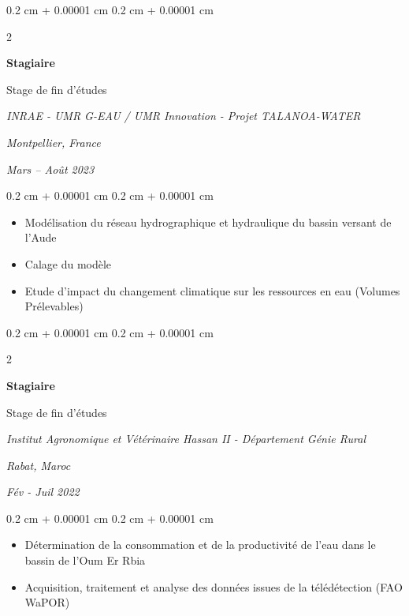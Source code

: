 \documentclass[10pt, letterpaper]{article}
\newenvironment{highlights}{
  \begin{itemize}[
    topsep=0.10 cm,
    parsep=0.10 cm,
    partopsep=0pt,
    itemsep=0pt,
    leftmargin=0.4 cm + 10pt
  ]
}{
  \end{itemize}
} %
\newenvironment{onecolentry}{
  \begin{adjustwidth}{
    0.2 cm + 0.00001 cm
  }{
    0.2 cm + 0.00001 cm
  }
}{
  \end{adjustwidth}
} %
\newenvironment{twocolentry}[2][]{
  \onecolentry
  \def\secondColumn{#2}
  \setcolumnwidth{\fill, 4.5 cm}
  \begin{paracol}{2}
}{
  \switchcolumn \raggedleft \secondColumn
  \end{paracol}
  \endonecolentry
} %
\begin{document}
\vspace{0.2 cm}

\begin{twocolentry} {
  \textit{Montpellier, France}  
  
  \textit{Mars – Août 2023}
} {
  \textbf{Stagiaire}

  Stage de fin d'études
  
  \textit{INRAE - UMR G-EAU / UMR Innovation - Projet TALANOA-WATER}
}
\end{twocolentry}

\vspace{0.10 cm}

\begin{onecolentry}
  \begin{highlights}
    \item Modélisation du réseau hydrographique et hydraulique du bassin
    versant de l'Aude
    \item Calage du modèle
    \item Etude d'impact du changement climatique sur les ressources en eau
    (Volumes Prélevables)
  \end{highlights}
\end{onecolentry}

\vspace{0.2 cm}

\begin{twocolentry}
  {
    \textit{Rabat, Maroc}

    \textit{Fév - Juil 2022}
  }
  {
    \textbf{Stagiaire}

    Stage de fin d'études

    \textit{Institut Agronomique et Vétérinaire Hassan II - Département
    Génie Rural}
  }
\end{twocolentry}

\vspace{0.10 cm}

\begin{onecolentry}
  \begin{highlights}
    \item Détermination de la consommation et de la productivité de l'eau
    dans le bassin de l'Oum Er Rbia
    \item Acquisition, traitement et analyse des données issues de la
    télédétection (FAO WaPOR)
  \end{highlights}
\end{onecolentry}

\vspace{0.2 cm}
\end{document}
